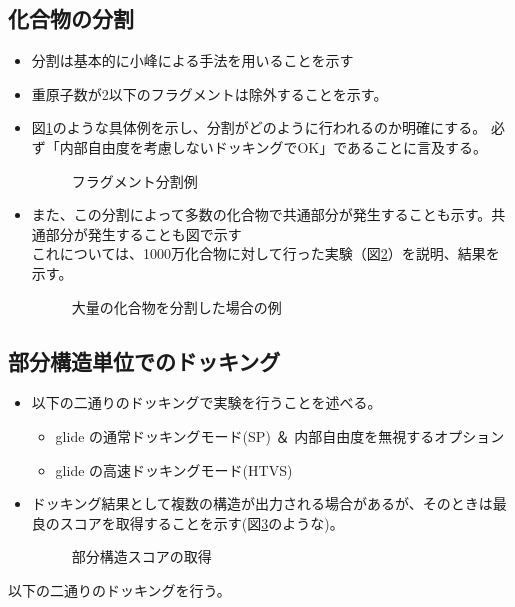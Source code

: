 \subsection{化合物の分割}
\begin{itemize}
\item 分割は基本的に小峰による手法を用いることを示す\cite{}
\item 重原子数が2以下のフラグメントは除外することを示す。
\item 図\ref{fig:ex_decomposition}のような具体例を示し、分割がどのように行われるのか明確にする。
	必ず「内部自由度を考慮しないドッキングでOK」であることに言及する。
	\begin{figure}[htp]
	 \begin{center}
	  \caption{フラグメント分割例}
	  \label{fig:ex_decomposition}
	 \end{center}
	\end{figure}
\item また、この分割によって多数の化合物で共通部分が発生することも示す。共通部分が発生することも図で示す\\
	これについては、1000万化合物に対して行った実験（図\ref{fig:decomposition_amount}）を説明、結果を示す。
	\begin{figure}[htp]
	 \begin{center}
	  \caption{大量の化合物を分割した場合の例}
	  \label{fig:decomposition_amount}
	 \end{center}
	\end{figure}

\end{itemize}

\subsection{部分構造単位でのドッキング}
\begin{itemize}
\item 以下の二通りのドッキングで実験を行うことを述べる。
	\begin{itemize}
	\item glide の通常ドッキングモード(SP) ＆ 内部自由度を無視するオプション
	\item glide の高速ドッキングモード(HTVS)
	\end{itemize}
\item ドッキング結果として複数の構造が出力される場合があるが、そのときは最良のスコアを取得することを示す(図\ref{fig:fragment_result}のような)。
	\begin{figure}[htp]
	 \begin{center}
	  \caption{部分構造スコアの取得}
	  \label{fig:fragment_result}
	 \end{center}
	\end{figure}
\end{itemize}
以下の二通りのドッキングを行う。

